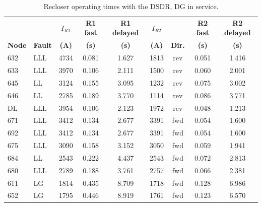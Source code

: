 \documentclass[12pt,a4paper]{article}
\begin{document}
\begin{table}[H]
\centering\footnotesize
\setlength{\tabcolsep}{4pt}
\begin{tabular}{|l|l|c|c|c|c|c|c|c|}
\hline
 & & \textbf{$I_{R1}$} & \textbf{R1 fast} & \textbf{R1 delayed} & \textbf{$I_{R2}$} & & \textbf{R2 fast} & \textbf{R2 delayed} \\
\textbf{Node} & \textbf{Fault} & \textbf{(A)} & \textbf{(s)} & \textbf{(s)} & \textbf{(A)} & \textbf{Dir.} & \textbf{(s)} & \textbf{(s)} \\ \hline
632 & LLL & 4734 & 0.081 & 1.627 & 1813 & rev & 0.051 & 1.416 \\ \hline
633 & LLL & 3970 & 0.106 & 2.111 & 1500 & rev & 0.060 & 2.001 \\ \hline
645 & LL & 3124 & 0.155 & 3.095 & 1232 & rev & 0.075 & 3.002 \\ \hline
646 & LL & 2785 & 0.189 & 3.770 & 1114 & rev & 0.086 & 3.771 \\ \hline
DL & LLL & 3954 & 0.106 & 2.123 & 1972 & rev & 0.048 & 1.213 \\ \hline
671 & LLL & 3412 & 0.134 & 2.677 & 3391 & fwd & 0.054 & 1.600 \\ \hline
692 & LLL & 3412 & 0.134 & 2.677 & 3391 & fwd & 0.054 & 1.600 \\ \hline
675 & LLL & 3090 & 0.158 & 3.152 & 3050 & fwd & 0.059 & 1.941 \\ \hline
684 & LL & 2543 & 0.222 & 4.437 & 2543 & fwd & 0.072 & 2.813 \\ \hline
680 & LLL & 2789 & 0.188 & 3.761 & 2757 & fwd & 0.066 & 2.381 \\ \hline
611 & LG & 1814 & 0.435 & 8.709 & 1718 & fwd & 0.128 & 6.986 \\ \hline
652 & LG & 1795 & 0.446 & 8.919 & 1761 & fwd & 0.123 & 6.570 \\ \hline
\end{tabular}
\caption{Recloser operating times with the DSDR, DG in service.}
\label{tab:t4a}
\end{table}
\end{document}
